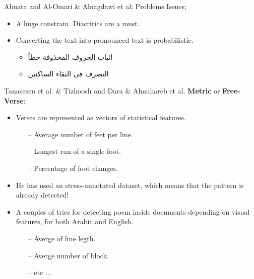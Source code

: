 \documentclass[10pt]{beamer}
\begin{document}
\begin{frame}[fragile]{Abuata and Al-Omari \& Alnagdawi et al; Problems}
Issues;
    \begin{itemize}
       \item A huge constrain. \alert{Diacritics} are a must.
       \item Converting the text into pronounced text is \alert{probabilistic}.
            \begin{itemize}
                \item \textarabic{اثبات الحروف المحذوفة خطاً}
                \item \textarabic{التصرف فى التقاء الساكنين}
            \end{itemize}
    \end{itemize}
\end{frame}




\begin{frame}[fragile]{Tanasescu et al. \&  Tizhoosh and Dara \& Almuhareb et al.}
\textbf{Metric} or \textbf{Free-Verse}: 
        \begin{itemize}
            \item Verses are represented as vectors of \alert{statistical features}.
            \begin{itemize}
                \item[--] Average number of feet per line.
                \item[--] Longest run of a single foot.
                \item[--] Percentage of foot changes.
            \end{itemize}
            \item He has used an stress-annotated dataset, which means that the pattern is already detected!
            \item A couples of tries for detecting poem inside documents depending on visual features, for both Arabic and English.
            \begin{itemize}
                \item[--] Averge of line legth.
                \item[--] Averge number of block.
                \item[--] etc ...
            \end{itemize}
        \end{itemize}
\end{frame}
\end{document}
